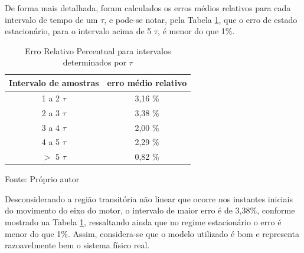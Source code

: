 

De forma mais detalhada, 
foram calculados os erros médios relativos para cada intervalo de 
tempo de um $\tau$, 
e pode-se notar, 
pela Tabela \ref{tab:ErroModeloTau}, 
que o erro de estado estacionário, para o intervalo acima de 5 $\tau$, é menor do que 1\%. 


\begin{table}[h]
\centering
\caption{Erro Relativo Percentual para intervalos determinados por $\tau$ }
\label{tab:ErroModeloTau}

\begin{tabular}{c|c}
\hline
Intervalo de amostras  &  erro médio relativo \\ \hline
\hline
1 a 2 $\tau$ &  3,16 \% \\ \hline
2 a 3 $\tau$ &  3,38 \% \\ \hline
3 a 4 $\tau$ &  2,00 \% \\ \hline
4 a 5 $\tau$ &  2,29 \% \\ \hline
$>$ 5 $\tau$ &  0,82 \% \\ \hline
\end{tabular}

{\vspace{0.2cm} \small Fonte: Próprio autor}
\end{table}


Desconsiderando a região transitória não linear 
que ocorre nos instantes iniciais do movimento do eixo do motor, 
o intervalo de maior erro é de 3,38\%, 
conforme mostrado na Tabela \ref{tab:ErroModeloTau},
ressaltando ainda que no regime estacionário 
o erro é menor do que 1\%.
Assim, considera-se que o modelo utilizado é bom e representa razoavelmente bem o sistema físico real.


